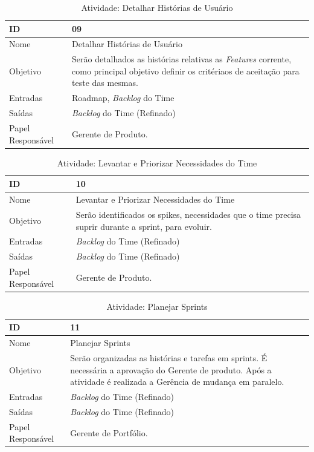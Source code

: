   \begin{table}[H]
    \centering
      \begin{tabular}{| m{5em} | m{10cm} |}
        \hline
        ID       & 09   \\ \hline
        Nome     & Detalhar Histórias de Usuário  \\ \hline
        Objetivo & Serão detalhados as histórias relativas as \textit{Features}  corrente, como principal objetivo definir os critériaos de aceitação para teste das mesmas.  \\ \hline
        Entradas & Roadmap, \textit{Backlog} do Time\\ \hline
        Saídas   & \textit{Backlog} do Time (Refinado) \\ \hline
        Papel Responsável   & Gerente de Produto. \\ \hline
      \end{tabular}
      \caption{Atividade: Detalhar Histórias de Usuário}
      \label{tabela:atividade9}
  \end{table}

  \begin{table}[H]
    \centering
      \begin{tabular}{| m{5em} | m{10cm} |}
        \hline
        ID       & 10   \\ \hline
        Nome     & Levantar e Priorizar Necessidades do Time  \\ \hline
        Objetivo & Serão identificados os spikes, necessidades que o time precisa suprir durante a sprint, para evoluir.  \\ \hline
        Entradas & \textit{Backlog} do Time (Refinado)\\ \hline
        Saídas   & \textit{Backlog} do Time (Refinado) \\ \hline
        Papel Responsável   & Gerente de Produto. \\ \hline
      \end{tabular}
      \caption{Atividade: Levantar e Priorizar Necessidades do Time}
      \label{tabela:atividade10}
  \end{table}

  \begin{table}[H]
    \centering
      \begin{tabular}{| m{5em} | m{10cm} |}
        \hline
        ID       & 11   \\ \hline
        Nome     & Planejar Sprints  \\ \hline
        Objetivo & Serão  organizadas as histórias e tarefas em sprints. É necessária a aprovação do Gerente de produto. Após a atividade é realizada a Gerência de mudança em paralelo.  \\ \hline
        Entradas & \textit{Backlog} do Time (Refinado)\\ \hline
        Saídas   & \textit{Backlog} do Time (Refinado) \\ \hline
        Papel Responsável   & Gerente de Portfólio. \\ \hline
      \end{tabular}
      \caption{Atividade: Planejar Sprints}
      \label{tabela:atividade11}
  \end{table}

